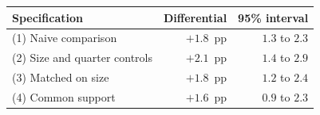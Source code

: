 \begin{tabular}{lrr}
\toprule
Specification & Differential & 95\% interval \\
\midrule
(1) Naive comparison & $+1.8$~pp & $1.3$ to $2.3$ \\
(2) Size and quarter controls & $+2.1$~pp & $1.4$ to $2.9$ \\
(3) Matched on size & $+1.8$~pp & $1.2$ to $2.4$ \\
(4) Common support & $+1.6$~pp & $0.9$ to $2.3$ \\
\bottomrule
\end{tabular}
